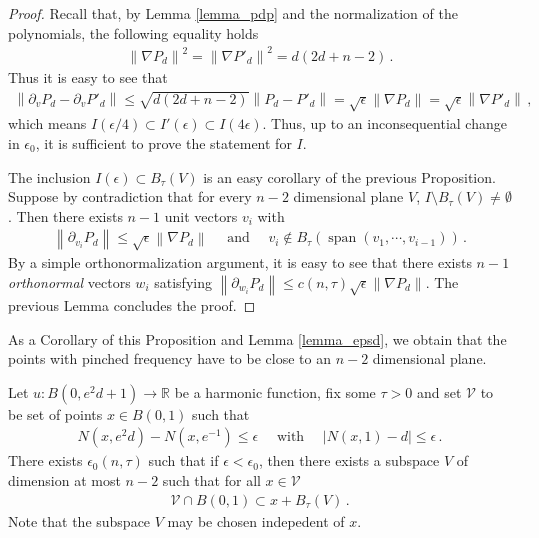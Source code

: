 \documentclass[11pt]{article}
\begin{document}
\begin{proof}
 Recall that, by Lemma \ref{lemma_pdp} and the normalization of the polynomials, the following equality holds
 \begin{gather}
  {\left\|{\nabla P_d}\right\|}^2 = {\left\|{\nabla P'_d}\right\|}^2 = d(2d+n-2)\, .
 \end{gather}
Thus it is easy to see that
\begin{gather}
 {\left\|{\partial_v P_d - \partial_v P'_d}\right\|} \leq \sqrt{d(2d+n-2)} {\left\|{P_d-P'_d}\right\|}= \sqrt{\epsilon}{\left\|{\nabla P_d}\right\|}=\sqrt \epsilon {\left\|{\nabla{P'_d}}\right\|}\, ,
\end{gather}
which means $I(\epsilon/4)\subset I'(\epsilon)\subset I(4\epsilon)$. Thus, up to an inconsequential change in $\epsilon_0$, it is sufficient to prove the statement for $I$.

The inclusion $I(\epsilon)\subset B_\tau(V)$ is an easy corollary of the previous Proposition. Suppose by contradiction that for every $n-2$ dimensional plane $V$, $I\setminus B_\tau(V)\neq \emptyset$. Then there exists $n-1$ unit vectors $v_i$ with 
\begin{gather}
{\left\|{\partial_{v_i} P_d}\right\|}\leq \sqrt \epsilon {\left\|{\nabla P_d}\right\|}\quad \text{  and  }\quad  v_i \not \in B_\tau {\left({\operatorname{span}(v_1,\cdots,v_{i-1})}\right)}\, .
\end{gather}
By a simple orthonormalization argument, it is easy to see that there exists $n-1$ \textit{orthonormal} vectors $w_i$ satisfying ${\left\|{\partial_{w_i} P_d}\right\|}\leq c(n,\tau)\sqrt\epsilon {\left\|{\nabla P_d}\right\|}$. The previous Lemma concludes the proof.
\end{proof}

As a Corollary of this Proposition and Lemma \ref{lemma_epsd}, we obtain that the points with pinched frequency have to be close to an $n-2$ dimensional plane.
\begin{corollary}\label{cor_alcone}
Let $u:B(0,e^2d+1)\to {\mathbb{R}}$ be a harmonic function, fix some $\tau>0$ and set ${\mathcal{V}}$ to be set of points $x\in B(0,1)$ such that
\begin{gather}
 N(x,e^2 d)-N(x,e^{-1})\leq \epsilon \quad \text{ with } \quad {\left|{N(x,1)-d}\right|}\leq \epsilon\, .
\end{gather}
There exists $\epsilon_0(n,\tau)$ such that if $\epsilon<\epsilon_0$, then there exists a subspace $V$ of dimension at most $n-2$ such that for all $x\in {\mathcal{V}}$
\begin{gather}
 {\mathcal{V}}\cap B(0,1)\subset x+B_\tau (V)\, .
\end{gather}
Note that the subspace $V$ may be chosen indepedent of $x$.
\end{corollary}
\end{document}
